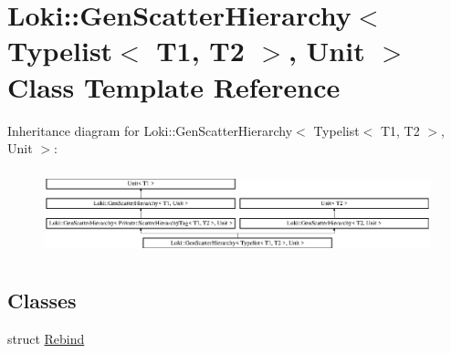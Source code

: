 \hypertarget{classLoki_1_1GenScatterHierarchy_3_01Typelist_3_01T1_00_01T2_01_4_00_01Unit_01_4}{}\section{Loki\+:\+:Gen\+Scatter\+Hierarchy$<$ Typelist$<$ T1, T2 $>$, Unit $>$ Class Template Reference}
\label{classLoki_1_1GenScatterHierarchy_3_01Typelist_3_01T1_00_01T2_01_4_00_01Unit_01_4}
Inheritance diagram for Loki\+:\+:Gen\+Scatter\+Hierarchy$<$ Typelist$<$ T1, T2 $>$, Unit $>$\+:\begin{figure}[H]
\begin{center}
\leavevmode
\includegraphics[height=2.500000cm]{classLoki_1_1GenScatterHierarchy_3_01Typelist_3_01T1_00_01T2_01_4_00_01Unit_01_4}
\end{center}
\end{figure}
\subsection*{Classes}
\begin{DoxyCompactItemize}
\item 
struct \hyperlink{structLoki_1_1GenScatterHierarchy_3_01Typelist_3_01T1_00_01T2_01_4_00_01Unit_01_4_1_1Rebind}{Rebind}
\end{DoxyCompactItemize}
